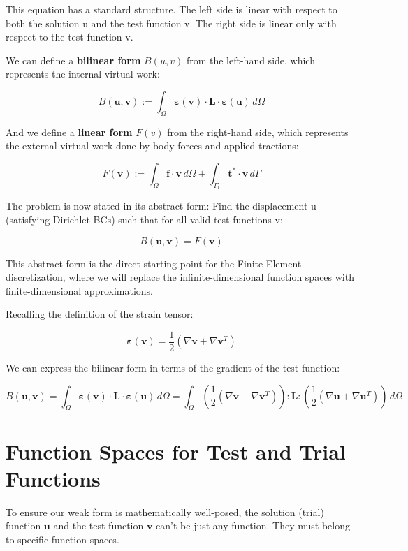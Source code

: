 \documentclass[
  11pt,
  a4paper,
]{scrbook}
\begin{document}
This equation has a standard structure. The left side is linear with
respect to both the solution u and the test function v. The right side
is linear only with respect to the test function v.

We can define a \textbf{bilinear form} \(B(u,v)\) from the left-hand
side, which represents the internal virtual work:

\[B(\mathbf{u}, \mathbf{v}) := \int_{\Omega} \boldsymbol{\varepsilon}(\mathbf{v}) \cdot \boldsymbol{L} \cdot \boldsymbol{\varepsilon}(\mathbf{u}) \, d\Omega\]

And we define a \textbf{linear form} \(F(v)\) from the right-hand side,
which represents the external virtual work done by body forces and
applied tractions:

\[F(\mathbf{v}) := \int_{\Omega} \mathbf{f} \cdot \mathbf{v} \, d\Omega + \int_{\Gamma_t} \mathbf{t}^* \cdot \mathbf{v} \, d\Gamma\]

The problem is now stated in its abstract form: Find the displacement u
(satisfying Dirichlet BCs) such that for all valid test functions v:

\[B(\mathbf{u}, \mathbf{v}) = F(\mathbf{v})\]

This abstract form is the direct starting point for the Finite Element
discretization, where we will replace the infinite-dimensional function
spaces with finite-dimensional approximations.

Recalling the definition of the strain tensor:

\[\boldsymbol{\varepsilon}(\mathbf{v}) = \frac{1}{2}(\nabla \mathbf{v} + \nabla \mathbf{v}^T)\]

We can express the bilinear form in terms of the gradient of the test
function:

\[B(\mathbf{u}, \mathbf{v}) = \int_{\Omega} \boldsymbol{\varepsilon}(\mathbf{v}) \cdot \boldsymbol{L} \cdot \boldsymbol{\varepsilon}(\mathbf{u}) \, d\Omega = \int_{\Omega} \left(\frac{1}{2}(\nabla \mathbf{v} + \nabla \mathbf{v}^T)\right) : \boldsymbol{L} : \left(\frac{1}{2}(\nabla \mathbf{u} + \nabla \mathbf{u}^T)\right) \, d\Omega\]

\section{Function Spaces for Test and Trial
Functions}\label{function-spaces-for-test-and-trial-functions}

To ensure our weak form is mathematically well-posed, the solution
(trial) function \(\boldsymbol{u}\) and the test function
\(\boldsymbol{v}\) can't be just any function. They must belong to
specific function spaces.
\end{document}
